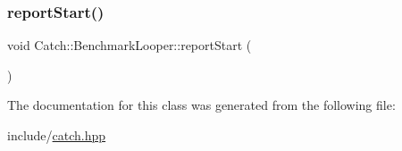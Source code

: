 \mbox{\label{classCatch_1_1BenchmarkLooper_a0697d1b266112b110edf2025b82c4e77}} 
\subsubsection{\texorpdfstring{report\+Start()}{reportStart()}}
{\footnotesize\ttfamily void Catch\+::\+Benchmark\+Looper\+::report\+Start (\begin{DoxyParamCaption}{ }\end{DoxyParamCaption})}



The documentation for this class was generated from the following file\+:\begin{DoxyCompactItemize}
\item 
include/\mbox{\hyperlink{catch_8hpp}{catch.\+hpp}}\end{DoxyCompactItemize}
